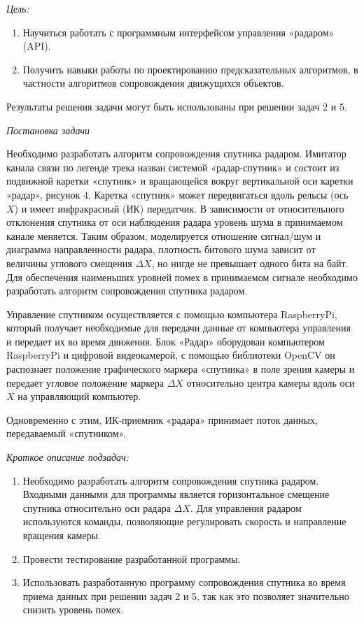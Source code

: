 
\textit{Цель:}

\begin{enumerate}
    \item Научиться работать с программным интерфейсом управления «радаром» (API).
    \item Получить навыки работы по проектированию предсказательных алгоритмов, в частности алгоритмов сопровождения движущихся объектов.
\end{enumerate}

Результаты решения задачи могут быть использованы при решении задач 2 и 5.

\textit{Постановка задачи}

Необходимо разработать алгоритм сопровождения спутника радаром. Имитатор канала связи по легенде трека назван системой «радар-спутник» и состоит из подвижной каретки «спутник» и вращающейся вокруг вертикальной оси каретки «радар», рисунок 4. Каретка «спутник» может передвигаться вдоль рельсы (ось $X$) и имеет инфракрасный (ИК) передатчик. В зависимости от относительного отклонения спутника от оси наблюдения радара уровень шума в принимаемом канале меняется. Таким образом, моделируется отношение сигнал/шум и диаграмма направленности радара, плотность битового шума зависит от величины углового смещения $\Delta X$, но нигде не превышает одного бита на байт. Для обеспечения наименьших уровней помех в принимаемом сигнале необходимо разработать алгоритм сопровождения спутника радаром.

Управление спутником осуществляется с помощью компьютера RaspberryPi, который получает необходимые для передачи данные от компьютера управления и передает их во время движения. Блок «Радар» оборудован компьютером RaspberryPi и цифровой видеокамерой, с помощью библиотеки OpenCV он распознает положение графического маркера «спутника» в поле зрения камеры и передает угловое положение маркера $\Delta X$ относительно центра камеры вдоль оси $X$ на управляющий компьютер.

Одновременно с этим, ИК-приемник «радара» принимает поток данных, передаваемый «спутником».

\textit{Краткое описание подзадач:}

\begin{enumerate}
    \item Необходимо разработать алгоритм сопровождения спутника радаром. Входными данными для программы является горизонтальное смещение спутника относительно оси радара $\Delta X$. Для управления радаром используются команды, позволяющие регулировать скорость и направление вращения камеры.
    \item Провести тестирование разработанной программы.
    \item Использовать разработанную программу сопровождения спутника во время приема данных при решении задач 2 и 5, так как это позволяет значительно снизить уровень помех.
\end{enumerate}

